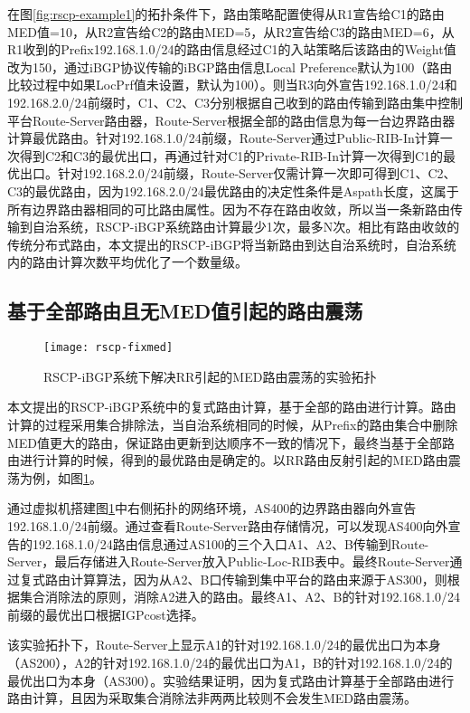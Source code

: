 在图\ref{fig:rscp-example1}的拓扑条件下，路由策略配置使得从R1宣告给C1的路由MED值=10，从R2宣告给C2的路由MED=5，从R2宣告给C3的路由MED=6，从R1收到的Prefix192.168.1.0/24的路由信息经过C1的入站策略后该路由的Weight值改为150，通过iBGP协议传输的iBGP路由信息Local Preference默认为100（路由比较过程中如果LocPrf值未设置，默认为100）。则当R3向外宣告192.168.1.0/24和192.168.2.0/24前缀时，C1、C2、C3分别根据自己收到的路由传输到路由集中控制平台Route-Server路由器，Route-Server根据全部的路由信息为每一台边界路由器计算最优路由。针对192.168.1.0/24前缀，Route-Server通过Public-RIB-In计算一次得到C2和C3的最优出口，再通过针对C1的Private-RIB-In计算一次得到C1的最优出口。针对192.168.2.0/24前缀，Route-Server仅需计算一次即可得到C1、C2、C3的最优路由，因为192.168.2.0/24最优路由的决定性条件是Aspath长度，这属于所有边界路由器相同的可比路由属性。因为不存在路由收敛，所以当一条新路由传输到自治系统，RSCP-iBGP系统路由计算最少1次，最多N次。相比有路由收敛的传统分布式路由，本文提出的RSCP-iBGP将当新路由到达自治系统时，自治系统内的路由计算次数平均优化了一个数量级。

\subsection{基于全部路由且无MED值引起的路由震荡}


\begin{figure}
  \centering
  \texttt{[image: rscp-fixmed]}
  \caption{RSCP-iBGP系统下解决RR引起的MED路由震荡的实验拓扑}
  \label{fig:rscp-fixmed}
\end{figure}


本文提出的RSCP-iBGP系统中的复式路由计算，基于全部的路由进行计算。路由计算的过程采用集合排除法，当自治系统相同的时候，从Prefix的路由集合中删除MED值更大的路由，保证路由更新到达顺序不一致的情况下，最终当基于全部路由进行计算的时候，得到的最优路由是确定的。以RR路由反射引起的MED路由震荡为例，如图\ref{fig:rscp-fixmed}。

通过虚拟机搭建图\ref{fig:rscp-fixmed}中右侧拓扑的网络环境，AS400的边界路由器向外宣告192.168.1.0/24前缀。通过查看Route-Server路由存储情况，可以发现AS400向外宣告的192.168.1.0/24路由信息通过AS100的三个入口A1、A2、B传输到Route-Server，最后存储进入Route-Server放入Public-Loc-RIB表中。最终Route-Server通过复式路由计算算法，因为从A2、B口传输到集中平台的路由来源于AS300，则根据集合消除法的原则，消除A2进入的路由。最终A1、A2、B的针对192.168.1.0/24前缀的最优出口根据IGPcost选择。

该实验拓扑下，Route-Server上显示A1的针对192.168.1.0/24的最优出口为本身（AS200），A2的针对192.168.1.0/24的最优出口为A1，B的针对192.168.1.0/24的最优出口为本身（AS300）。实验结果证明，因为复式路由计算基于全部路由进行路由计算，且因为采取集合消除法非两两比较则不会发生MED路由震荡。



